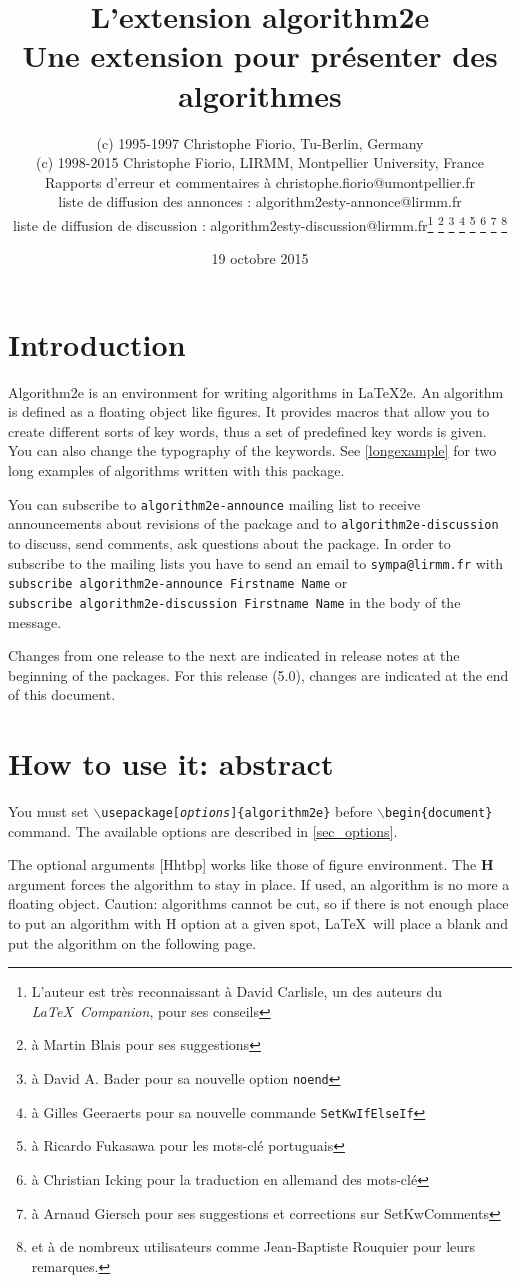 \documentclass[a4paper]{article}
\title{L'extension \textsf{algorithm2e}\\ Une extension pour présenter des algorithmes\\ {\large\algocfversion}}
\author{(c) 1995-1997 Christophe Fiorio, Tu-Berlin, Germany\\
(c) 1998-2015 Christophe Fiorio, LIRMM, Montpellier University, France\\
  Rapports d'erreur et commentaires à christophe.fiorio@umontpellier.fr\\
  liste de diffusion des annonces : algorithm2esty-annonce@lirmm.fr \\
  liste de diffusion de discussion : algorithm2esty-discussion@lirmm.fr\thanks{L'auteur est très reconnaissant à David Carlisle, un des auteurs du \emph{\LaTeX\ Companion}, pour ses conseils} \thanks{à Martin Blais pour ses suggestions} \thanks{à David A. Bader pour sa nouvelle option \texttt{noend}} \thanks{à Gilles Geeraerts pour sa nouvelle commande \texttt{SetKwIfElseIf}} \thanks{à Ricardo Fukasawa pour les mots-clé portuguais} \thanks{à Christian Icking pour la traduction en allemand des mots-clé} 
  \thanks{à Arnaud Giersch pour ses suggestions et corrections sur SetKwComments}
\thanks{et à de nombreux utilisateurs comme Jean-Baptiste Rouquier pour leurs remarques.} }
\date{19 octobre 2015}
\begin{document}
\maketitle
\vspace{-0.5cm}

\tableofcontents
\clearpage

\section{Introduction}

\tradini
Algorithm2e is an environment for writing algorithms in \LaTeX2e{}.  An algorithm is defined as a floating object
like figures.  It provides macros that allow you to create different sorts of key words, thus a set of predefined
key words is given. You can also change the typography of the keywords. See \autoref{longexample} for two long
examples of algorithms written with this package.


You can subscribe to \texttt{algorithm2e-announce} mailing list to receive
announcements about revisions of the package and to
\texttt{algorithm2e-discussion} to discuss, send comments,
ask questions about the package.
\makeatletter
In order to subscribe to the mailing lists you have to send an email to
\texttt{sympa@lirmm.fr} with \texttt{subscribe algorithm2e-announce Firstname
  Name} or\\\texttt{subscribe algorithm2e-discussion Firstname
  Name} in the body of the message.\makeatother

Changes from one release to the next are indicated in release notes at the beginning of the packages. For this
release (5.0), changes are indicated at the end of this document.

\section{How to use it: abstract}

You must set
\texttt{$\backslash$usepackage[\emph{options}]\{algorithm2e\}} before 
\texttt{$\backslash$begin\{document\}} command. The available options
are described in \autoref{sec_options}.


The optional arguments [Hhtbp] works like those of figure environment.  The
\textbf{H} argument forces the algorithm to stay in place. If used, an algorithm
is no more a floating object.  Caution: algorithms cannot be cut, so if there is
not enough place to put an algorithm with H option at a given spot, \LaTeX\ will
place a blank and put the algorithm on the following page.
\end{document}
